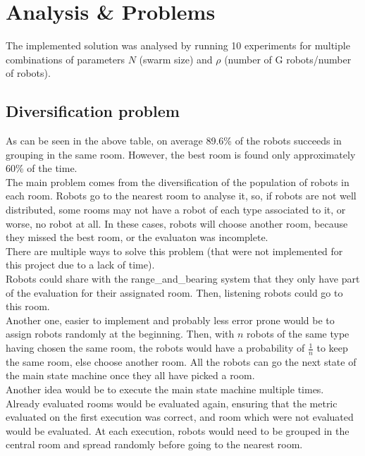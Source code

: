 \section{Analysis \& Problems}

The implemented solution was analysed by running 10 experiments for multiple
combinations of parameters $N$ (swarm size) and $\rho$
(number of G robots/number of robots).



\subsection{Diversification problem}

As can be seen in the above table, on average 89.6\% of the robots succeeds in grouping in the same room. However, the best room is found only approximately
60\% of the time.\\

The main problem comes from the diversification of the population of robots in
each room. Robots go to the nearest room to analyse it, so, if robots are not
well distributed, some rooms may not have a robot of each type associated to it,
or worse, no robot at all. In these cases, robots will choose another room,
because they missed the best room, or the evaluaton was incomplete.\\

There are multiple ways to solve this problem (that were not implemented for
this project due to a lack of time).\\

Robots could share with the range\_and\_bearing system that they only have part of
the evaluation for their assignated room. Then, listening robots could go to
this room.\\

Another one, easier to implement and probably less error prone would be to
assign robots randomly at the beginning. Then, with $n$ robots of the same type
having chosen the same room, the robots would have a probability of
$\frac{1}{n}$ to keep the same room, else choose another room. All the robots
can go the next state of the main state machine once they all have picked a
room.\\

Another idea would be to execute the main state machine multiple times. Already
evaluated rooms would be evaluated again, ensuring that the metric evaluated on
the first execution was correct, and room which were not evaluated would be
evaluated. At each execution, robots would need to be grouped in the central
room and spread randomly before going to the nearest room.

